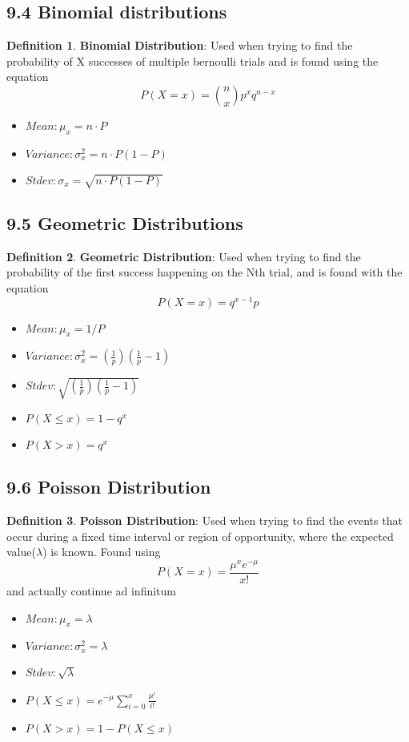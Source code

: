 \documentclass[12pt]{amsart}
\theoremstyle{definition}
\newtheorem{definition}{Definition} %
\numberwithin{equation}{theorem}    %
\begin{document}
\subsection*{9.4 Binomial distributions}

\begin{definition}
    \textbf{Binomial Distribution}:
    Used when trying to find the probability of X successes of multiple bernoulli trials and is found using
    the equation $$P(X=x) = {n\choose x} p^xq^{n-x} $$
    \begin{itemize}
        \item $Mean:\mu_x = n\cdot P$
        \item $Variance: \sigma_x^2 = n\cdot P(1-P)$
        \item $Stdev: \sigma_x = \sqrt{n\cdot P(1-P)}$
    \end{itemize}
\end{definition}


\subsection*{9.5 Geometric Distributions}

\begin{definition}
    \textbf{Geometric Distribution}:
    Used when trying to find the probability of the first success happening on the Nth trial, 
    and is found with the equation $$P(X=x) = q^{x-1}p$$
    \begin{itemize}
        \item $Mean:\mu_x = 1/P$
        \item $Variance: \sigma_x^2 =(\frac{1}{p})(\frac{1}{p}-1)$
        \item $Stdev: \sqrt{(\frac{1}{p})(\frac{1}{p}-1)}$
        \item $P(X\leq x) = 1-q^x$
        \item $P(X > x) = q^x$
    \end{itemize}
\end{definition}

\subsection*{9.6 Poisson Distribution}

\begin{definition}
    \textbf{Poisson Distribution}:
    Used when trying to find the events that occur during a fixed time interval
    or region of opportunity, where the expected value($\lambda$) is known. Found using 
    $$P(X=x) = \frac{\mu^xe^{-\mu}}{x!}$$ and actually continue ad infinitum
    \begin{itemize}
        \item $Mean:\mu_x = \lambda$
        \item $Variance: \sigma_x^2 =\lambda$
        \item $Stdev: \sqrt{\lambda}$
        \item $P(X\leq x) = e^{-\mu}\sum_{i=0}^x\frac{\mu^i}{i!}$
        \item $P(X > x) = 1-P(X\leq x)$
    \end{itemize}
    
\end{definition}
\end{document}
